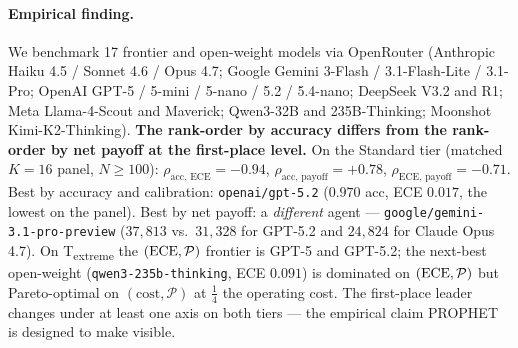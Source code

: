 \paragraph{Empirical finding.} We benchmark 17 frontier and
open-weight models via OpenRouter (Anthropic Haiku 4.5 / Sonnet 4.6 /
Opus 4.7; Google Gemini 3-Flash / 3.1-Flash-Lite / 3.1-Pro; OpenAI
GPT-5 / 5-mini / 5-nano / 5.2 / 5.4-nano; DeepSeek V3.2 and R1; Meta
Llama-4-Scout and Maverick; Qwen3-32B and 235B-Thinking; Moonshot
Kimi-K2-Thinking). \textbf{The rank-order by accuracy differs from the
rank-order by net payoff at the first-place level.} On the Standard
tier (matched $K = 16$ panel, $N \ge 100$):
$\rho_{\text{acc, ECE}} = -0.94$,
$\rho_{\text{acc, payoff}} = +0.78$,
$\rho_{\text{ECE, payoff}} = -0.71$. Best by accuracy and calibration:
\texttt{openai/gpt-5.2} ($0.970$ acc, ECE $0.017$, the lowest on the
panel). Best by net payoff: a \emph{different} agent ---
\texttt{google/gemini-3.1-pro-preview} ($37{,}813$ vs.\ $31{,}328$ for
GPT-5.2 and $24{,}824$ for Claude Opus 4.7). On
T\textsubscript{extreme} the $(\mathrm{ECE}, \mathcal{P})$ frontier is GPT-5
and GPT-5.2; the next-best open-weight (\texttt{qwen3-235b-thinking},
ECE $0.091$) is dominated on $(\mathrm{ECE}, \mathcal{P})$ but Pareto-optimal
on $(\text{cost}, \mathcal{P})$ at $\frac{1}{4}$ the operating cost.
The first-place leader changes under at least one axis on both tiers
--- the empirical claim PROPHET is designed to make visible.
